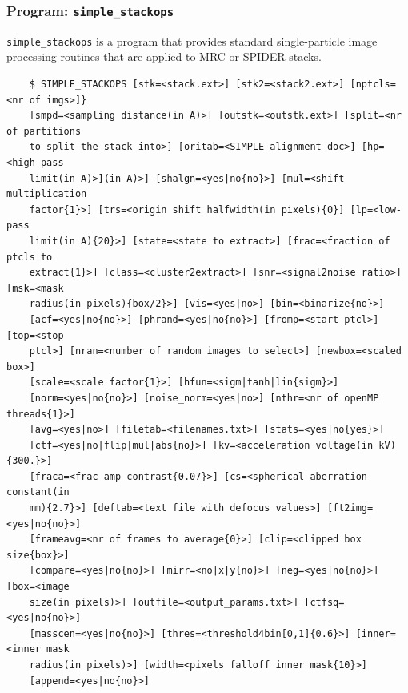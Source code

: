 \documentclass[a4paper,11pt]{article}
\newcommand{\prgname}[1]{\textcolor{NavyBlue}{\texttt{#1}}}
\begin{document}
\subsubsection{Program: \prgname{simple\_stackops}}
\label{stackops}
\prgname{simple\_stackops} is a program that provides standard single-particle image processing routines that are applied to MRC or SPIDER stacks.
\begin{verbatim}
    $ SIMPLE_STACKOPS [stk=<stack.ext>] [stk2=<stack2.ext>] [nptcls=<nr of imgs>]}
    [smpd=<sampling distance(in A)>] [outstk=<outstk.ext>] [split=<nr of partitions
    to split the stack into>] [oritab=<SIMPLE alignment doc>] [hp=<high-pass
    limit(in A)>](in A)>] [shalgn=<yes|no{no}>] [mul=<shift multiplication
    factor{1}>] [trs=<origin shift halfwidth(in pixels){0}] [lp=<low-pass
    limit(in A){20}>] [state=<state to extract>] [frac=<fraction of ptcls to
    extract{1}>] [class=<cluster2extract>] [snr=<signal2noise ratio>] [msk=<mask
    radius(in pixels){box/2}>] [vis=<yes|no>] [bin=<binarize{no}>]
    [acf=<yes|no{no}>] [phrand=<yes|no{no}>] [fromp=<start ptcl>] [top=<stop
    ptcl>] [nran=<number of random images to select>] [newbox=<scaled box>]
    [scale=<scale factor{1}>] [hfun=<sigm|tanh|lin{sigm}>]
    [norm=<yes|no{no}>] [noise_norm=<yes|no>] [nthr=<nr of openMP threads{1}>]
    [avg=<yes|no>] [filetab=<filenames.txt>] [stats=<yes|no{yes}>]
    [ctf=<yes|no|flip|mul|abs{no}>] [kv=<acceleration voltage(in kV){300.}>]
    [fraca=<frac amp contrast{0.07}>] [cs=<spherical aberration constant(in
    mm){2.7}>] [deftab=<text file with defocus values>] [ft2img=<yes|no{no}>]
    [frameavg=<nr of frames to average{0}>] [clip=<clipped box size{box}>]
    [compare=<yes|no{no}>] [mirr=<no|x|y{no}>] [neg=<yes|no{no}>] [box=<image
    size(in pixels)>] [outfile=<output_params.txt>] [ctfsq=<yes|no{no}>]
    [masscen=<yes|no{no}>] [thres=<threshold4bin[0,1]{0.6}>] [inner=<inner mask
    radius(in pixels)>] [width=<pixels falloff inner mask{10}>]
    [append=<yes|no{no}>]
\end{verbatim}
\end{document}
